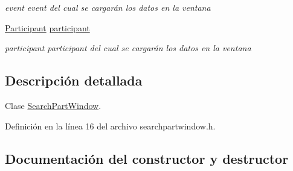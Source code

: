 \begin{DoxyCompactItemize}
\begin{DoxyCompactList}\small\item\em event event del cual se cargarán los datos en la ventana \end{DoxyCompactList}\item 
\hyperlink{class_participant}{Participant} \hyperlink{class_search_part_window_ac83a2e699f5479acfbecaa2cddbe0450}{participant}\hypertarget{class_search_part_window_ac83a2e699f5479acfbecaa2cddbe0450}{}\label{class_search_part_window_ac83a2e699f5479acfbecaa2cddbe0450}

\begin{DoxyCompactList}\small\item\em participant participant del cual se cargarán los datos en la ventana \end{DoxyCompactList}\end{DoxyCompactItemize}


\subsection{Descripción detallada}
Clase \hyperlink{class_search_part_window}{Search\+Part\+Window}. 

Definición en la línea 16 del archivo searchpartwindow.\+h.



\subsection{Documentación del constructor y destructor}
